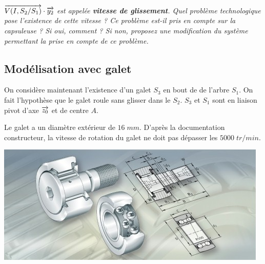 \documentclass[10pt,oneside]{article}
\begin{document}

\subparagraph{}
\textit{$\overrightarrow{V(I,S_2/S_1)}\cdot\overrightarrow{y_2}$ est appelée \textbf{vitesse de glissement}. Quel problème technologique pose l'existence de cette vitesse ? Ce problème est-il pris en compte sur la capsuleuse ? Si oui, comment ? Si non, proposez une modification du système permettant la prise en compte de ce problème.}



\subsection*{Modélisation avec galet}
\begin{minipage}[c]{.4\linewidth}
On considère maintenant l'existence d'un galet $S_3$ en bout de de l'arbre $S_1$. On fait l'hypothèse que le galet roule sans glisser dans le $S_2$. $S_3$ et $S_1$ sont en liaison pivot d'axe $\overrightarrow{z_0}$ et de centre $A$.

Le galet a un diamètre extérieur de $16\;mm$. D'après la documentation constructeur, la vitesse de rotation du galet ne doit pas dépasser les $5000\; tr/min$.
\end{minipage} \hfill
\begin{minipage}[c]{.55\linewidth}
\begin{center}
 \includegraphics[width=\textwidth]{png/galet}
\end{center}
\end{minipage}
\end{document}
